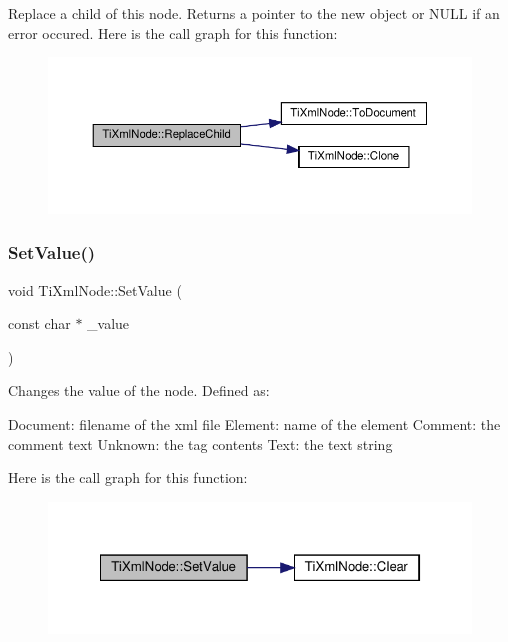 Replace a child of this node. Returns a pointer to the new object or N\+U\+LL if an error occured. Here is the call graph for this function\+:
\nopagebreak
\begin{figure}[H]
\begin{center}
\leavevmode
\includegraphics[width=350pt]{classTiXmlNode_a543208c2c801c84a213529541e904b9f_cgraph}
\end{center}
\end{figure}
\mbox{\label{classTiXmlNode_a2a38329ca5d3f28f98ce932b8299ae90}} 
\subsubsection{\texorpdfstring{Set\+Value()}{SetValue()}}
{\footnotesize\ttfamily void Ti\+Xml\+Node\+::\+Set\+Value (\begin{DoxyParamCaption}\item[{const char $\ast$}]{\+\_\+value }\end{DoxyParamCaption})\hspace{0.3cm}{\ttfamily [inline]}}

Changes the value of the node. Defined as\+: \begin{DoxyVerb}Document:   filename of the xml file
Element:    name of the element
Comment:    the comment text
Unknown:    the tag contents
Text:       the text string
\end{DoxyVerb}
 Here is the call graph for this function\+:
\nopagebreak
\begin{figure}[H]
\begin{center}
\leavevmode
\includegraphics[width=322pt]{classTiXmlNode_a2a38329ca5d3f28f98ce932b8299ae90_cgraph}
\end{center}
\end{figure}
\mbox{\label{classTiXmlNode_a0f4dd916b2afc2ab2f1a84f3e2b8fd5d}} 
